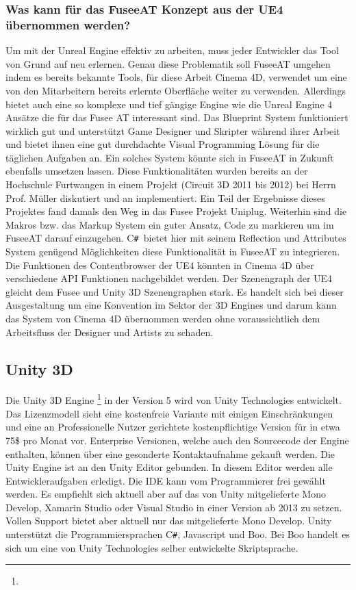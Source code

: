 \documentclass[pagesize, paper=a4, fontsize=12pt, titlepage=true, headings=small, headnosepline, abstractoff, liststotoc, nochapterprefix, plainheadsepline, twoside]{scrreprt}
\newcommand{\CS}{C\texttt{\#}}
\newcommand{\CSS}{C\texttt{\# }}
\begin{document}
\subsubsection{Was kann für das FuseeAT Konzept aus der UE4 übernommen werden?}
Um mit der Unreal Engine effektiv zu arbeiten, muss jeder Entwickler das Tool von Grund auf neu erlernen. Genau diese Problematik soll FuseeAT umgehen indem es bereits bekannte Tools, für diese Arbeit Cinema 4D, verwendet um eine von den Mitarbeitern bereits erlernte Oberfläche weiter zu verwenden. Allerdings bietet auch eine so komplexe und tief gängige Engine wie die Unreal Engine 4 Ansätze die für das Fusee AT interessant sind. Das Blueprint System funktioniert wirklich gut und unterstützt Game Designer und Skripter während ihrer Arbeit und bietet ihnen eine gut durchdachte Visual Programming Lösung für die täglichen Aufgaben an. Ein solches System könnte sich in FuseeAT in Zukunft ebenfalls umsetzen lassen. Diese Funktionalitäten wurden bereits an der Hochschule Furtwangen in einem Projekt (Circuit 3D 2011 bis 2012) bei Herrn Prof. Müller diskutiert und an implementiert. Ein Teil der Ergebnisse dieses Projektes fand damals den Weg in das Fusee Projekt Uniplug.
Weiterhin sind die Makros bzw. das Markup System ein guter Ansatz, Code zu markieren um im FuseeAT darauf einzugehen. \CSS bietet hier mit seinem Reflection und Attributes System genügend Möglichkeiten diese Funktionalität in FuseeAT zu integrieren. Die Funktionen des Contentbrowser der UE4 könnten in Cinema 4D über verschiedene API Funktionen nachgebildet werden. Der Szenengraph der UE4 gleicht dem Fusee und Unity 3D Szenengraphen stark. Es handelt sich bei dieser Ausgestaltung um eine Konvention im Sektor der 3D Engines und darum kann das System von Cinema 4D übernommen werden ohne voraussichtlich dem Arbeitsfluss der Designer und Artists zu schaden.

\subsection{Unity 3D}
Die Unity 3D Engine \footnote{} in der Version 5 wird von Unity Technologies entwickelt. Das Lizenzmodell sieht eine kostenfreie Variante mit einigen Einschränkungen und eine an Professionelle Nutzer gerichtete kostenpflichtige Version für in etwa 75\$ pro Monat vor. Enterprise Versionen, welche auch den Sourcecode der Engine enthalten, können über eine gesonderte Kontaktaufnahme gekauft werden. Die Unity Engine ist an den Unity Editor gebunden. In diesem Editor werden alle Entwickleraufgaben erledigt. Die IDE kann vom Programmierer frei gewählt werden. Es empfiehlt sich aktuell aber auf das von Unity mitgelieferte Mono Develop, Xamarin Studio oder Visual Studio in einer Version ab 2013 zu setzen. Vollen Support bietet aber aktuell nur das mitgelieferte Mono Develop. Unity unterstützt die Programmiersprachen \CS, Javascript und Boo. Bei Boo handelt es sich um eine von Unity Technologies selber entwickelte Skriptsprache.
\end{document}
